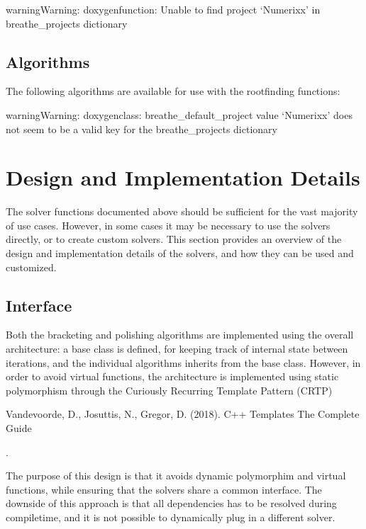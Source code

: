 \documentclass[letterpaper,10pt,english]{sphinxmanual}
\begin{document}
\begin{sphinxadmonition}{warning}{Warning:}
\sphinxAtStartPar
doxygenfunction: Unable to find project ‘Numerixx’ in breathe\_projects dictionary
\end{sphinxadmonition}


\subsection{Algorithms}
\label{\detokenize{docRoots:algorithms}}
\sphinxAtStartPar
The following algorithms are available for use with the root\sphinxhyphen{}finding functions:

\begin{sphinxadmonition}{warning}{Warning:}
\sphinxAtStartPar
doxygenclass: breathe\_default\_project value ‘Numerixx’ does not seem to be a valid key for the breathe\_projects dictionary
\end{sphinxadmonition}


\section{Design and Implementation Details}
\label{\detokenize{docRoots:design-and-implementation-details}}
\sphinxAtStartPar
The solver functions documented above should be sufficient for the vast majority of use cases. However, in some cases it may be necessary to use the solvers directly, or to create custom solvers. This section provides an overview of the design and implementation details of the solvers, and how they can be used and customized.


\subsection{Interface}
\label{\detokenize{docRoots:interface}}
\sphinxAtStartPar
Both the bracketing and polishing algorithms are implemented using the overall architecture: a base class is defined, for keeping track of internal state between iterations, and the individual algorithms inherits from the base class. However, in order to avoid virtual functions, the architecture is implemented using static polymorphism through the Curiously Recurring Template Pattern (CRTP) %
\begin{footnote}[1]\sphinxAtStartFootnote
Vandevoorde, D., Josuttis, N., Gregor, D. (2018). C++ Templates \sphinxhyphen{} The Complete Guide
%
\end{footnote}.

\sphinxAtStartPar
The purpose of this design is that it avoids dynamic polymorphim and virtual functions, while ensuring that the solvers share a common interface. The downside of this approach is that all dependencies has to be resolved during compile\sphinxhyphen{}time, and it is not possible to dynamically plug in a different solver.
\end{document}
